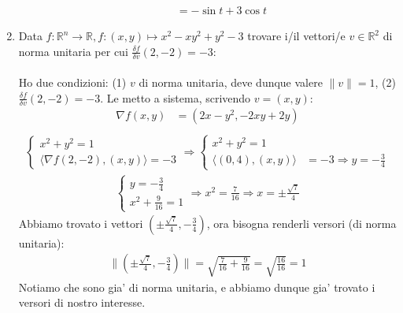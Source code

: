 \documentclass{article}
\begin{document}
\begin{enumerate}
\begin{enumerate}
\begin{align*}
            &= -\sin t + 3\cos t
        \end{align*}
    \end{enumerate}
  \item Data $f: \mathbb{R}^n \to \mathbb{R}, f: (x, y) \mapsto x^2 - xy^2 + y^2 - 3$
    trovare i/il vettori/e $v \in \mathbb{R}^2$ di norma unitaria per cui 
    $\frac{\delta f}{\delta v} (2, -2) = -3$: \\ \\
    Ho due condizioni: (1) $v$ di norma unitaria, deve dunque valere $\| v \| = 1$,
    (2) $\frac{\delta f}{\delta v} (2, -2) = -3$. Le metto a sistema, scrivendo
    $v = (x, y)$:
    \begin{align*}
      \nabla f(x, y) &= (2x - y^2, -2xy + 2y) \\
    \end{align*}
    \begin{align*}
      \begin{cases}
        x^2 + y^2 = 1 \\
        \langle \nabla f(2, -2), (x, y) \rangle = -3
      \end{cases} \Rightarrow 
      \begin{cases}
        x^2 + y^2 = 1 \\
        \langle (0, 4), (x, y) \rangle &= -3 \Rightarrow y = -\frac{3}{4}
      \end{cases}
    \end{align*}
    \begin{align*}
      \begin{cases}
        y = -\frac{3}{4} \\
        x^2 + \frac{9}{16} = 1
      \end{cases} \Rightarrow x^2 = \frac{7}{16} \Rightarrow x = \pm \frac{\sqrt{7}}{4}
    \end{align*}
    Abbiamo trovato i vettori $(\pm \frac{\sqrt{7}}{4}, -\frac{3}{4})$, ora bisogna
    renderli versori (di norma unitaria):
    \begin{align*}
      \|(\pm \frac{\sqrt{7}}{4}, -\frac{3}{4})\| = \sqrt{\frac{7}{16} + \frac{9}{16}}
      = \sqrt{\frac{16}{16}} = 1
    \end{align*}
    Notiamo che sono gia' di norma unitaria, e abbiamo dunque gia' trovato i versori di nostro interesse.


\end{enumerate}
\end{document}
